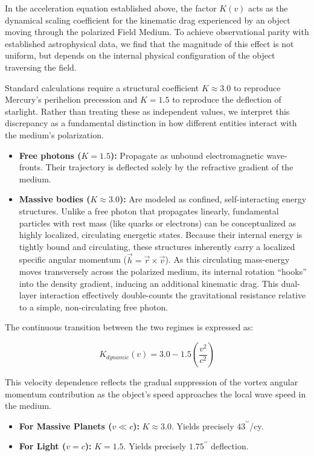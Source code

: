 \documentclass[twocolumn]{article}
\providecommand{\tightlist}{%
  \setlength{\itemsep}{0pt}\setlength{\parskip}{0pt}}
\begin{document}
In the acceleration equation established above, the factor \(K(v)\) acts
as the dynamical scaling coefficient for the kinematic drag experienced
by an object moving through the polarized Field Medium. To achieve
observational parity with established astrophysical data, we find that
the magnitude of this effect is not uniform, but depends on the internal
physical configuration of the object traversing the field.

Standard calculations require a structural coefficient \(K \approx 3.0\)
to reproduce Mercury's perihelion precession and \(K = 1.5\) to
reproduce the deflection of starlight. Rather than treating these as
independent values, we interpret this discrepancy as a fundamental
distinction in how different entities interact with the medium's
polarization.

\begin{itemize}
\tightlist
\item
  \textbf{Free photons (\(K = 1.5\)):} Propagate as unbound
  electromagnetic wave-fronts. Their trajectory is deflected solely by
  the refractive gradient of the medium.
\item
  \textbf{Massive bodies (\(K \approx 3.0\)):} Are modeled as confined,
  self-interacting energy structures. Unlike a free photon that
  propagates linearly, fundamental particles with rest mass (like quarks
  or electrons) can be conceptualized as highly localized, circulating
  energetic states. Because their internal energy is tightly bound and
  circulating, these structures inherently carry a localized specific
  angular momentum (\(\vec{h} = \vec{r} \times \vec{v}\)). As this
  circulating mass-energy moves transversely across the polarized
  medium, its internal rotation ``hooks'' into the density gradient,
  inducing an additional kinematic drag. This dual-layer interaction
  effectively double-counts the gravitational resistance relative to a
  simple, non-circulating free photon.
\end{itemize}

The continuous transition between the two regimes is expressed as:

\[K_{dynamic}(v) = 3.0 - 1.5 \left( \frac{v^2}{c^2} \right)\]

This velocity dependence reflects the gradual suppression of the vortex
angular momentum contribution as the object's speed approaches the local
wave speed in the medium.

\begin{itemize}
\tightlist
\item
  \textbf{For Massive Planets (\(v \ll c\)):} \(K \approx 3.0\). Yields
  precisely \(43^{\prime\prime}\)/cy.
\item
  \textbf{For Light (\(v = c\)):} \(K = 1.5\). Yields precisely
  \(1.75^{\prime\prime}\) deflection.
\end{itemize}
\end{document}
